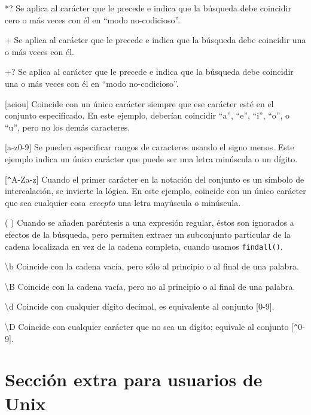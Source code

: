 *? \newline
Se aplica al carácter que le precede e indica que la búsqueda debe coincidir cero o más veces con él
en ``modo no-codicioso''.

+ \newline
Se aplica al carácter que le precede e indica que la búsqueda debe coincidir una o más veces con él.

+? \newline
Se aplica al carácter que le precede e indica que la búsqueda debe coincidir una o más veces con él
en ``modo no-codicioso''.

[aeiou] \newline
Coincide con un único carácter siempre que ese carácter esté en el conjunto especificado. En este ejemplo,
deberían coincidir ``a'', ``e'', ``i'', ``o'', o ``u'', pero no los demás caracteres.

[a-z0-9] \newline
Se pueden especificar rangos de caracteres usando el signo menos. Este ejemplo indica un único carácter
que puede ser una letra minúscula o un dígito.

[\verb"^"A-Za-z] \newline
Cuando el primer carácter en la notación del conjunto es un símbolo de intercalación, se invierte la lógica. En
este ejemplo, coincide con un único carácter que sea cualquier cosa {\em excepto} una letra mayúscula o minúscula.

( ) \newline
Cuando se añaden paréntesis a una expresión regular, éstos son ignorados a efectos de la búsqueda,
pero permiten extraer un subconjunto particular de la cadena localizada en vez de la cadena
completa, cuando usamos {\tt findall()}.

{\textbackslash}b \newline
Coincide con la cadena vacía, pero sólo al principio o al final de una palabra.

{\textbackslash}B \newline
Coincide con la cadena vacía, pero no al principio o al final de una palabra.

{\textbackslash}d \newline
Coincide con cualquier dígito decimal, es equivalente al conjunto [0-9].

{\textbackslash}D \newline
Coincide con cualquier carácter que no sea un dígito; equivale al conjunto [\verb"^"0-9].

\section{Sección extra para usuarios de Unix}

